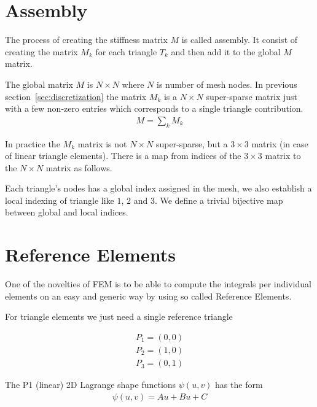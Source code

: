 \documentclass{birkjour}
\numberwithin{equation}{section}
\begin{document}
\section{Assembly}


The process of creating the stiffness matrix $M$ is called assembly. It consist of creating the matrix $M_k$ for each 
triangle $T_k$ and then add it to the global $M$ matrix. 
 
The global matrix $M$ is $N \times N$  where $N$ is number of mesh nodes. In previous section~\ref{sec:discretization}
the matrix $M_k$ is a $N \times N$ super-sparse matrix just with a few non-zero entries which corresponds to a single 
triangle contribution.
 \begin{eqnarray} 
	M = \sum_k M_k
\end{eqnarray}
 
In practice the $M_k$ matrix is not $N \times N$ super-sparse, but a $3 \times 3$ matrix (in case of linear triangle elements).
There is a map from indices of the $3 \times 3$ matrix to the $N \times N$ matrix as follows.
 
Each triangle's nodes has a global index assigned in the mesh, we also establish a local indexing of triangle
like $1$, $2$ and $3$. We define a trivial bijective map between global and local indices.

\section{Reference Elements}

One of the novelties of FEM is to be able to compute the integrals per individual elements on an easy and generic 
way by using so called Reference Elements.
 
For triangle elements we just need a single reference triangle
 
\begin{center}
\end{center}
\begin{eqnarray} 
	P_1 = (0,0) \nonumber\\
	P_2 = (1,0) \nonumber\\
	P_3 = (0,1) \nonumber
\end{eqnarray}

The P1 (linear) 2D Lagrange shape functions $\psi(u,v)$ has the form 
\begin{eqnarray} 
	\psi(u,v) = A u + B u + C \nonumber
\end{eqnarray}
\end{document}

